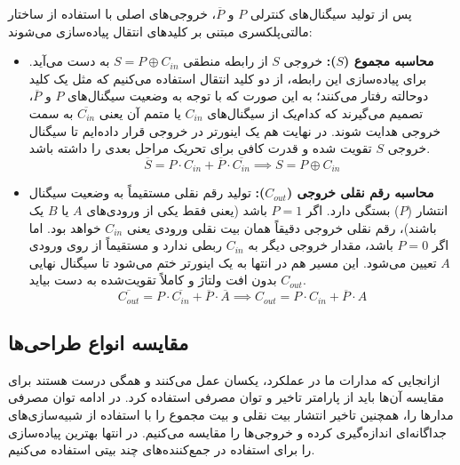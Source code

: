 پس از تولید سیگنال‌های کنترلی $P$ و $\overline{P}$، خروجی‌های اصلی با استفاده از ساختار مالتی‌پلکسری مبتنی بر کلیدهای انتقال پیاده‌سازی می‌شوند:
\begin{itemize}
    \item \textbf{محاسبه مجموع ($S$):}
          خروجی $S$ از رابطه منطقی $S = P \oplus C_{in}$ به دست می‌آید. برای پیاده‌سازی این رابطه، از دو کلید انتقال استفاده می‌کنیم که مثل یک کلید دوحالته رفتار می‌کنند؛ به این صورت که با توجه به وضعیت سیگنال‌های $P$ و $\overline{P}$، تصمیم می‌گیرند که کدام‌یک از سیگنال‌های $C_{in}$ یا متمم آن یعنی $\overline{C_{in}}$ به سمت خروجی هدایت شوند. در نهایت هم یک اینورتر در خروجی قرار داده‌ایم تا سیگنال خروجی $S$ تقویت شده و قدرت کافی برای تحریک مراحل بعدی را داشته باشد.
          $$
              \overline{S} = P \cdot C_{in} + \overline{P} \cdot \overline{C_{in}} \implies S = P \oplus C_{in}
          $$

    \item \textbf{محاسبه رقم نقلی خروجی ($C_{out}$):}
          تولید رقم نقلی مستقیماً به وضعیت سیگنال انتشار ($P$) بستگی دارد. اگر $P = 1$ باشد (یعنی فقط یکی از ورودی‌های $A$ یا $B$ یک باشند)، رقم نقلی خروجی دقیقاً همان بیت نقلی ورودی یعنی $C_{in}$ خواهد بود. اما اگر $P = 0$ باشد، مقدار خروجی دیگر به $C_{in}$ ربطی ندارد و مستقیماً از روی ورودی $A$ تعیین می‌شود. این مسیر هم در انتها به یک اینورتر ختم می‌شود تا سیگنال نهایی $C_{out}$ بدون افت ولتاژ و کاملاً تقویت‌شده به دست بیاید.
          $$
              \overline{C_{out}} = P \cdot \overline{C_{in}} + \overline{P} \cdot \overline{A} \implies C_{out} = P \cdot C_{in} + \overline{P} \cdot A
          $$
\end{itemize}






\newpage

\subsection{مقایسه انواع طراحی‌ها}

\indent
ازانجایی که مدارات ما در عملکرد، یکسان عمل می‌کنند و همگی درست هستند برای مقایسه آن‌ها باید از پارامتر تاخیر و توان مصرفی استفاده کرد.
در ادامه توان مصرفی مدار‌ها را، همچنین تاخیر انتشار بیت نقلی و بیت مجموع را با استفاده از شبیه‌سازی‌های جداگانه‌ای اندازه‌گیری کرده و خروجی‌ها را مقایسه می‌کنیم.
در انتها بهترین پیاده‌سازی را برای استفاده در جمع‌کننده‌های چند بیتی استفاده می‌کنیم.

